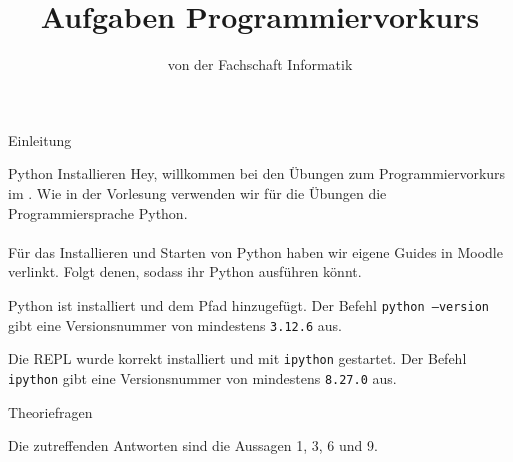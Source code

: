 
\title{Aufgaben Programmiervorkurs}
\subtitle{von der Fachschaft Informatik\hfill\ptitle}

\usepackage{hyperref}
\usepackage{wrapfig}
\usepackage{footnote}


\maketitle{}

\begin{task}[points=auto]{Einleitung}
    \begin{subtask*}[points=0]{Python Installieren}
        Hey, willkommen bei den Übungen zum Programmiervorkurs im \ptitle. Wie in der
        Vorlesung verwenden wir für die Übungen die Programmiersprache Python. \\\\
        Für das Installieren und Starten von Python haben wir eigene Guides in Moodle verlinkt.
        Folgt denen, sodass ihr Python ausführen könnt.
        \begin{solution}
            Python ist installiert und dem Pfad hinzugefügt. Der Befehl
            \texttt{python --version} gibt eine Versionsnummer von mindestens \texttt{3.12.6} aus.

            Die REPL wurde korrekt installiert und mit \texttt{ipython} gestartet. Der Befehl
            \texttt{ipython} gibt eine Versionsnummer von mindestens \texttt{8.27.0} aus.
        \end{solution}
    \end{subtask*}
    \begin{subtask*}[points=0]{Theoriefragen}
        \begin{itemize}
            \mchead
        \end{itemize}
        \begin{solution}
            Die zutreffenden Antworten sind die Aussagen 1, 3, 6 und 9.
        \end{solution}
    \end{subtask*}
\end{task}
